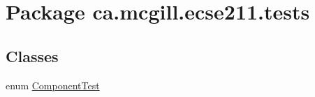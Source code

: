 \hypertarget{namespaceca_1_1mcgill_1_1ecse211_1_1tests}{}\section{Package ca.\+mcgill.\+ecse211.\+tests}
\label{namespaceca_1_1mcgill_1_1ecse211_1_1tests}
\subsection*{Classes}
\begin{DoxyCompactItemize}
\item 
enum \hyperlink{enumca_1_1mcgill_1_1ecse211_1_1tests_1_1_component_test}{Component\+Test}
\end{DoxyCompactItemize}

